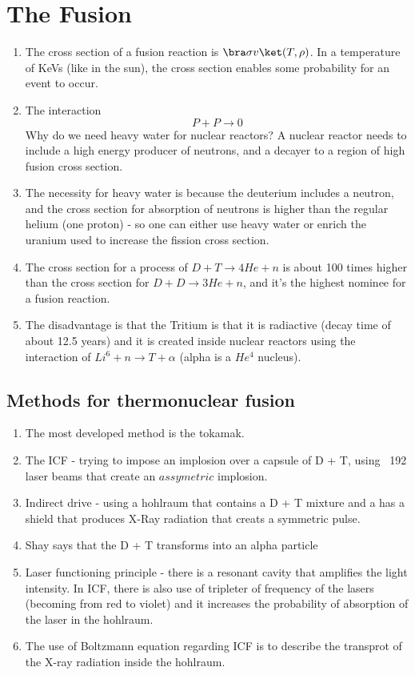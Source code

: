 \documentclass[11pt]{article}
\begin{document}
\section{The Fusion}
\begin{enumerate}
    \item The cross section of a fusion reaction is $\bra\sigma v\ket(T,\rho)$. In a temperature of KeVs (like in the sun), the cross section enables some probability for an event to occur.
    \item The interaction 
    \begin{equation}
        P + P \to 0
    \end{equation}
    Why do we need heavy water for nuclear reactors? A nuclear reactor needs to include a high energy producer of neutrons, and a decayer to a region of high fusion cross section.
    \item The necessity for heavy water is because the deuterium includes a neutron, and the cross section for absorption of neutrons is higher than the regular helium (one proton) - so one can either use heavy water or enrich the uranium used to increase the fission cross section.
    \item The cross section for a process of $D + T \to 4He + n$ is about 100 times higher than the cross section for $D + D \to 3He + n$, and it's the highest nominee for a fusion reaction.
    \item The disadvantage is that the Tritium is that it is radiactive (decay time of about 12.5 years) and it is created inside nuclear reactors using the interaction of $Li^6 + n \to T + \alpha$ (alpha is a $He^4$ nucleus).
\end{enumerate}
\subsection{Methods for thermonuclear fusion}
\begin{enumerate}
    \item The most developed method is the tokamak.
    \item The ICF - trying to impose an implosion over a capsule of D + T, using ~192 laser beams that create an $assymetric$ implosion.
    \item Indirect drive - using a hohlraum that contains a D + T mixture and a has a shield that produces X-Ray radiation that creats a symmetric pulse.
    \item Shay says that the D + T transforms into an alpha particle 
    \item Laser functioning principle - there is a resonant cavity that amplifies the light intensity. In ICF, there is also use of tripleter of frequency of the lasers (becoming from red to violet) and it increases the probability of absorption of the laser in the hohlraum.
    \item The use of Boltzmann equation regarding ICF is to describe the transprot of the X-ray radiation inside the hohlraum.
\end{enumerate}
\end{document}
